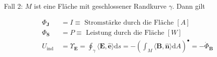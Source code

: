 \documentclass[10pt]{article}
\begin{document}
Fall 2: $M$ ist eine Fläche mit geschlossener Randkurve $\gamma$. Dann gilt


\begin{align*}
\Phi_{\mathbf{J}} & =I \equiv \text { Stromstärke durch die Fläche }[A]  \tag{2.131}\\
\Phi_{\mathbf{S}} & =P \equiv \text { Leistung durch die Fläche }[W]  \tag{2.132}\\
U_{\text {ind }} & =\Upsilon_{\mathbf{E}}=\oint_{\gamma}\langle\mathbf{E}, \hat{\mathbf{e}}\rangle \mathrm{d} s=-\left(\int_{M}\langle\mathbf{B}, \hat{\mathbf{n}}\rangle \mathrm{d} A\right)^{\bullet}=-\dot{\Phi}_{\mathbf{B}} \tag{2.133}
\end{align*}
\end{document}
